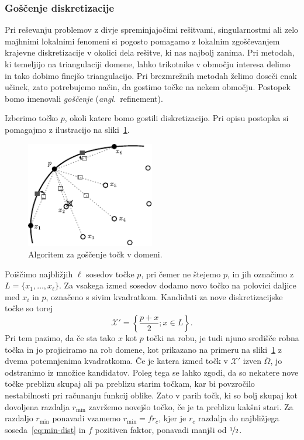 \documentclass[12pt,a4paper,twoside]{article}
\theoremstyle{definition} %
\theoremstyle{plain} %
\numberwithin{equation}{section}
\newcommand{\X}{\mathcal{X}}
\newcommand{\zomega}{\overline{\Omega}}
\newcommand{\ang}[1]{(\hspace{-1.5px}\textit{angl.}\ #1)}
\begin{document}
\subsubsection{Goščenje diskretizacije}
\label{sec:goscenje}
Pri reševanju problemov z divje spreminjajočimi rešitvami, singularnostmi ali zelo majhnimi
lokalnimi fenomeni si pogosto pomagamo z lokalnim zgoščevanjem krajevne diskretizacije v okolici
dela rešitve, ki nas najbolj zanima. Pri metodah, ki temeljijo na triangulaciji domene, lahko
trikotnike v območju interesa delimo in tako dobimo finejšo triangulacijo. Pri brezmrežnih
metodah želimo doseči enak učinek, zato potrebujemo način, da gostimo točke na nekem območju.
Postopek bomo imenovali \emph{goščenje} \ang{refinement}.

Izberimo točko $p$, okoli katere bomo gostili diskretizacijo. Pri opisu postopka si pomagajmo z
ilustracijo na sliki~\ref{fig:refine-algorithm}.
\begin{figure}[h]
  \centering
  \includegraphics[width=0.5\textwidth]{images/domain_refine.pdf}
  \caption{Algoritem za goščenje točk v domeni.}
  \label{fig:refine-algorithm}
\end{figure}
Poiščimo najbližjih $\ell$ sosedov točke $p$, pri čemer ne štejemo $p$, in jih označimo z $L = \{x_1,
\dots, x_\ell\}$. Za vsakega izmed sosedov dodamo novo točko na polovici daljice med $x_i$ in $p$,
označeno s sivim kvadratkom. Kandidati za nove diskretizacijske točke so torej
\begin{equation}
   \X' = \left\{ \frac{p+x}{2}; x \in L \right\}.
\end{equation}
Pri tem pazimo, da če sta tako $x$ kot $p$ točki na robu, je tudi njuno središče robna točka in jo
projiciramo na rob domene, kot prikazano na primeru na sliki~\ref{fig:refine-algorithm} z dvema
potemnjenima kvadratkoma. Če je katera izmed točk v $\X'$ izven $\zomega$, jo odstranimo iz množice
kandidatov. Poleg tega se lahko zgodi, da so nekatere nove točke preblizu skupaj ali pa preblizu
starim točkam, kar bi povzročilo nestabilnosti pri računanju funkcij oblike. Zato v parih točk, ki
so bolj skupaj kot dovoljena razdalja $r_{\text{min}}$ zavržemo novejšo točko, če je ta preblizu
kakšni stari. Za razdaljo $r_\text{min}$ ponavadi vzamemo $r_\text{min} = f r_c$, kjer je $r_c$
razdalja do najbližjega soseda~\eqref{eq:min-dist} in $f$ pozitiven faktor, ponavadi manjši od
$\nicefrac{1}{2}$.
\end{document}
